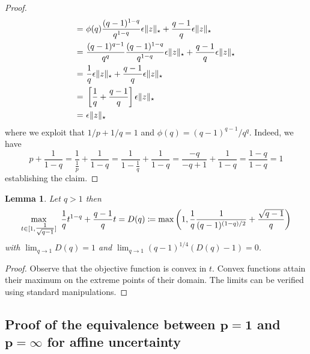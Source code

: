 \documentclass[12pt]{article}
\theoremstyle{thmstyleone}%
\newtheorem{lemma}[theorem]{Lemma}%
\theoremstyle{thmstyletwo}%
\theoremstyle{thmstylethree}%
\begin{document}
\begin{appendices}
\begin{proof}
\begin{align*}
  = ~&\phi(q) \frac{(q-1)^{1-q}}{q^{1-q}} \epsilon \| z \|_\star +\frac{q-1}{q} \epsilon \| z \|_\star\\
  = ~&\frac{(q-1)^{q-1}}{q^q} \frac{(q-1)^{1-q}}{q^{1-q}} \epsilon \| z \|_\star +\frac{q-1}{q} \epsilon \| z \|_\star\\
  = ~&\frac{1}{q} \epsilon \| z \|_\star +\frac{q-1}{q} \epsilon \| z \|_\star\\
  = ~&\left[\frac{1}{q}  +\frac{q-1}{q} \right] \epsilon \| z \|_\star\\
  = ~ & \epsilon \| z \|_\star
\end{align*}
where we exploit that $1/p+1/q=1$ and $\phi(q)=(q-1)^{q-1}/q^q$. Indeed, we have
\[
  p+\frac{1}{1-q} = \frac{1}{\frac{1}{p}} + \frac{1}{1-q} = \frac{1}{1-\frac{1}{q}}+\frac{1}{1-q} = \frac{-q}{-q+1}+\frac{1}{1-q}=\frac{1-q}{1-q}=1
\]
establishing the claim.
%
\end{proof}

\begin{lemma}
  \label{lemma:dual-helper-II}
  Let $q>1$ then
  \[
    \max_{t\in [1, \tfrac{1}{\sqrt{q-1}}]} ~\frac{1}{q} t^{1-q} +\frac{q-1}{q} t = D(q)\coloneqq \max\left(1, \frac{1}{q} \frac{1}{(q-1)^{(1-q)/2}} +\frac{\sqrt{q-1}}{q}\right)
  \]
  with $\lim_{q\to 1} D(q)=1$ and $\lim_{q\to 1} (q-1)^{1/4} \left(D(q)-1\right)=0$.
\end{lemma}
\begin{proof}
  Observe that the objective function is convex in $t$. Convex functions attain their maximum on the extreme points of their domain. The limits can be verified using standard manipulations.
\end{proof}


\ifpreprint
\subsection{Proof of the equivalence between $\mathbf{p =1}$ and  $\mathbf{p = \infty}$ for affine uncertainty}
\else

\end{appendices}
\end{document}

